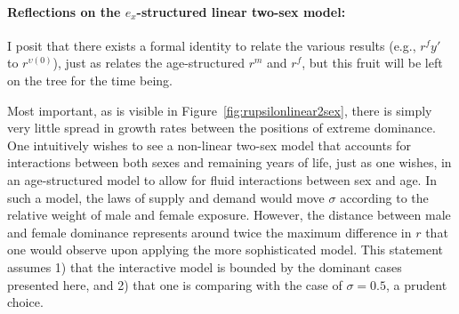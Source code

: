 \paragraph{Reflections on the $e_x$-structured linear two-sex model:}
I posit that there exists a formal identity to relate the various results
(e.g., $r^f{y'}$ to $r^{\upsilon (0)}$), just as \citet[pp. 56]{coale1972growth} relates 
the age-structured $r^m$ and $r^f$, but this fruit will be left on the tree
for the time being.

Most important, as is visible in Figure~\ref{fig:rupsilonlinear2sex}, there is
simply very little spread in growth rates between the positions of extreme
dominance. One intuitively wishes to see a non-linear two-sex model that
accounts for interactions between both sexes and remaining years of life, just
as one wishes, in an age-structured model to allow for fluid interactions
between sex and age. In such a model, the laws of supply and demand would move
$\sigma$ according to the relative weight of male and female exposure. However,
the distance between male and female dominance represents around twice the
maximum difference in $r$ that one would observe upon applying the more
sophisticated model. This statement assumes 1) that the interactive model is
bounded by the dominant cases presented here, and 2) that one is comparing with
the case of $\sigma = 0.5$, a prudent choice. 

